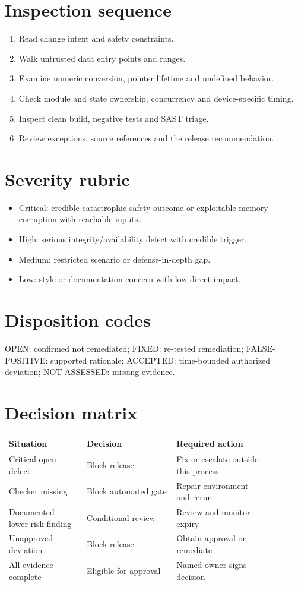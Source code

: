 \documentclass[10pt,letterpaper]{article}
\begin{document}
\makedoctitle
\makedocsummary
\section{Inspection sequence}
\begin{enumerate}
\item Read change intent and safety constraints.
\item Walk untrusted data entry points and ranges.
\item Examine numeric conversion, pointer lifetime and undefined behavior.
\item Check module and state ownership, concurrency and device-specific timing.
\item Inspect clean build, negative tests and SAST triage.
\item Review exceptions, source references and the release recommendation.
\end{enumerate}

\section{Severity rubric}
\begin{itemize}
\item Critical: credible catastrophic safety outcome or exploitable memory corruption with reachable inputs.
\item High: serious integrity/availability defect with credible trigger.
\item Medium: restricted scenario or defense-in-depth gap.
\item Low: style or documentation concern with low direct impact.
\end{itemize}

\section{Disposition codes}
OPEN: confirmed not remediated; FIXED: re-tested remediation; FALSE-POSITIVE: supported rationale; ACCEPTED: time-bounded authorized deviation; NOT-ASSESSED: missing evidence.
\section{Decision matrix}
\begin{longtable}{p{0.26\linewidth}p{0.30\linewidth}p{0.31\linewidth}}\toprule Situation & Decision & Required action\\\midrule\endhead
Critical open defect & Block release & Fix or escalate outside this process\\
Checker missing & Block automated gate & Repair environment and rerun\\
Documented lower-risk finding & Conditional review & Review and monitor expiry\\
Unapproved deviation & Block release & Obtain approval or remediate\\
All evidence complete & Eligible for approval & Named owner signs decision\\
\bottomrule\end{longtable}
\end{document}
